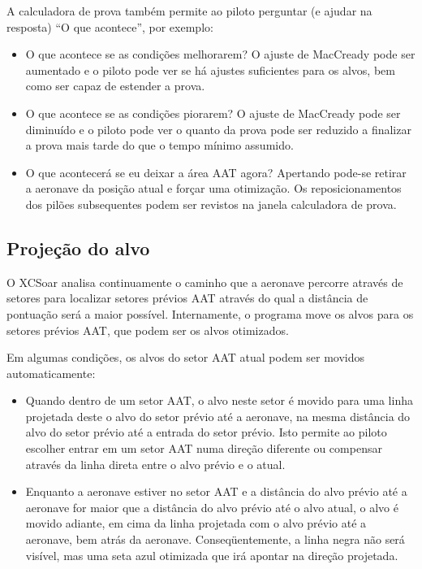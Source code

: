 A calculadora de prova também permite ao piloto perguntar (e ajudar na resposta) “O que acontece”, por exemplo: 
\begin{itemize}
\item O que acontece se as condições melhorarem? O ajuste de MacCready pode ser aumentado e o piloto pode ver se há ajustes suficientes para os alvos, bem como ser capaz de estender a prova.
\item O que acontece se as condições piorarem? O ajuste de MacCready pode ser diminuído e o piloto pode ver o quanto da prova pode ser reduzido a finalizar a prova mais tarde do que o tempo mínimo assumido.
\item O que acontecerá se eu deixar a área AAT agora?  Apertando   pode-se retirar a aeronave da posição atual e forçar uma otimização.  Os reposicionamentos dos pilões subsequentes podem ser revistos na janela calculadora de prova.
\end{itemize}

\subsection*{Projeção do alvo}

O XCSoar analisa continuamente o caminho que a aeronave percorre através de setores para localizar setores prévios AAT através do qual a distância de pontuação será a maior possível.  Internamente, o programa move os alvos para os setores prévios AAT, que podem ser os alvos otimizados.

Em algumas condições, os alvos do setor AAT atual podem ser movidos automaticamente:

\begin{itemize}
\item Quando dentro de um setor AAT, o alvo neste setor é movido para uma linha projetada deste o alvo do setor prévio até a aeronave, na mesma distância do alvo do setor prévio até a entrada do setor prévio.  Isto permite ao piloto escolher entrar em um setor AAT numa direção diferente ou compensar através da linha direta entre o alvo prévio e o atual.

\item Enquanto a aeronave estiver no setor AAT e a distância do alvo prévio até a aeronave for maior que a distância do alvo prévio até o alvo atual, o alvo é movido adiante, em cima da linha projetada com o alvo prévio até a aeronave, bem atrás da aeronave.  Conseqüentemente, a linha negra não será visível, mas uma seta azul otimizada que irá apontar na direção projetada.
\end{itemize}

